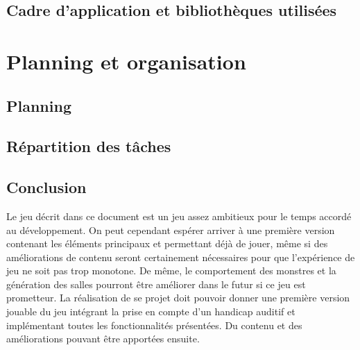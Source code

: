\documentclass[a4paper, 11pt]{report}
\begin{document}
    \chapter{Cadre d'application et bibliothèques utilisées}

  \part{Planning et organisation}

    \chapter{Planning}
      
    \chapter{Répartition des t\^aches}

  \chapter*{Conclusion} 
    Le jeu décrit dans ce document est un jeu assez ambitieux pour le temps accordé au développement. 
    On peut cependant espérer arriver à une première version contenant les éléments principaux et 
    permettant déjà de jouer, m\^eme si des améliorations de contenu seront certainement nécessaires
    pour que l'expérience de jeu ne soit pas trop monotone. De m\^eme, le comportement des monstres
    et la génération des salles pourront \^etre améliorer dans le futur si ce jeu est prometteur. La 
    réalisation de se projet doit pouvoir donner une première version jouable du jeu intégrant la prise en
    compte d'un handicap auditif et implémentant toutes les fonctionnalités présentées. Du contenu et
    des améliorations pouvant \^etre apportées ensuite.
   
  \clearpage
\end{document}
